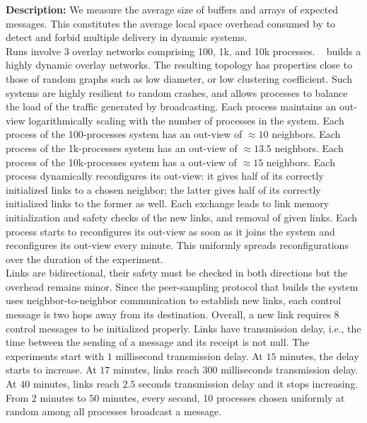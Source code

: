 \noindent \textbf{Description:} We measure the average size of buffers and
arrays of expected messages. This constitutes the average local space overhead
consumed by \RPCBROADCAST to detect and forbid multiple delivery in dynamic
systems.\\
Runs involve 3 overlay networks comprising 100, 1k, and 10k
processes. \SPRAY~\cite{nedelec2017adaptive} builds a highly dynamic overlay
networks. The resulting topology has properties close to those of random graphs
such as low diameter, or low clustering coefficient. Such systems are highly
resilient to random crashes, and allows processes to balance the load of the
traffic generated by broadcasting.  Each process maintains an out-view
logarithmically scaling with the number of processes in the system. Each process
of the 100-processes system has an out-view of $\approx 10$ neighbors. Each
process of the 1k-processes system has an out-view of $\approx 13.5$
neighbors. Each process of the 10k-processes system has a out-view of
$\approx 15$ neighbors.  Each process dynamically reconfigures its out-view: it
gives half of its correctly initialized links to a chosen neighbor; the latter
gives half of its correctly initialized links to the former as well. Each
exchange leads to link memory initialization and safety checks of the new links,
and removal of given links. Each process starts to reconfigures its out-view as
soon as it joins the system and reconfigures its out-view every minute. This
uniformly spreads reconfigurations over the duration of the
experiment.\\
Links are bidirectional, their safety must be checked in both directions but the
overhead remains minor. Since the peer-sampling protocol that builds the system
uses neighbor-to-neighbor communication to establish new links, each control
message is two hops away from its destination. Overall, a new link requires 8
control messages to be initialized properly. Links have transmission delay,
i.e., the time between the sending of a message and its receipt is not null. The
experiments start with $1$ millisecond transmission delay. At $15$ minutes, the
delay starts to increase. At $17$ minutes, links reach $300$ milliseconds
transmission delay. At $40$ minutes,
links reach $2.5$ seconds transmission delay and it stops increasing.\\
From $2$ minutes to $50$ minutes, every second, 10 processes chosen uniformly at
random among all processes broadcast a message.

